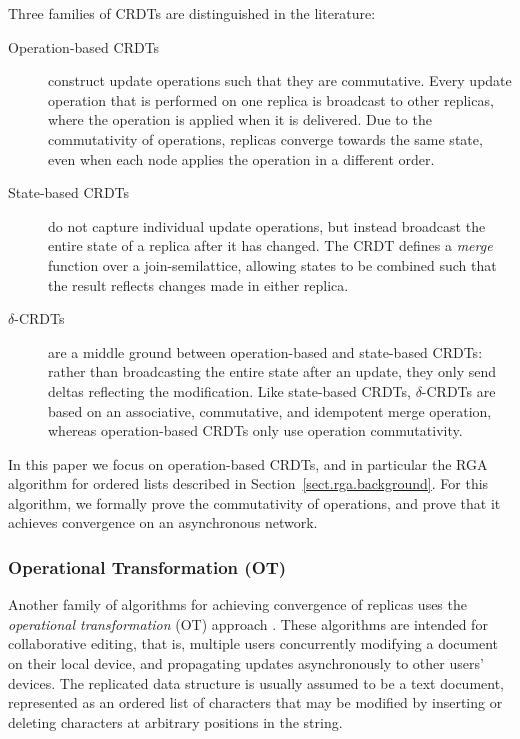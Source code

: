 Three families of CRDTs are distinguished in the literature:
\begin{description}
\item[Operation-based CRDTs] construct update operations such that they are commutative. Every
update operation that is performed on one replica is broadcast to other replicas, where the
operation is applied when it is delivered. Due to the commutativity of operations, replicas converge
towards the same state, even when each node applies the operation in a different order.
\item[State-based CRDTs] do not capture individual update operations, but instead broadcast the
entire state of a replica after it has changed. The CRDT defines a \emph{merge} function over a
join-semilattice, allowing states to be combined such that the result reflects changes made in
either replica.
\item[$\delta$-CRDTs] \cite{Almeida:2015fc} are a middle ground between operation-based and state-based
CRDTs: rather than broadcasting the entire state after an update, they only send deltas reflecting
the modification. Like state-based CRDTs, $\delta$-CRDTs are based on an associative, commutative,
and idempotent merge operation, whereas operation-based CRDTs only use operation commutativity.
\end{description}

In this paper we focus on operation-based CRDTs, and in particular the RGA algorithm for ordered
lists described in Section~\ref{sect.rga.background}. For this algorithm, we formally prove the
commutativity of operations, and prove that it achieves convergence on an asynchronous network.

\subsubsection{Operational Transformation (OT)}

Another family of algorithms for achieving convergence of replicas uses the \emph{operational
transformation} (OT) approach
\cite{Ellis:1989ue,Ressel:1996wx,Oster:2006tr,Sun:1998vf,Sun:1998un,Suleiman:1998eu,Nichols:1995fd}.
These algorithms are intended for collaborative editing, that is, multiple users concurrently
modifying a document on their local device, and propagating updates asynchronously to other users'
devices. The replicated data structure is usually assumed to be a text document, represented as an
ordered list of characters that may be modified by inserting or deleting characters at arbitrary
positions in the string.

